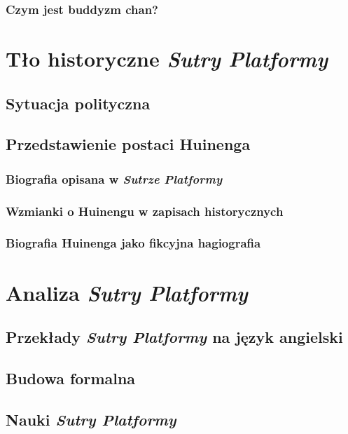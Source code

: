\subsection{Czym jest buddyzm chan?}
\chapter{Tło historyczne \textit{Sutry Platformy}}
\section{Sytuacja polityczna}
\section{Przedstawienie postaci Huinenga}
\subsection{Biografia opisana w \textit{Sutrze Platformy}}
\subsection{Wzmianki o Huinengu w zapisach historycznych}
\subsection{Biografia Huinenga jako fikcyjna hagiografia}
\chapter{Analiza \textit{Sutry Platformy}}
\section{Przekłady \textit{Sutry Platformy} na język angielski}
\section{Budowa formalna}
\section{Nauki \textit{Sutry Platformy}}

